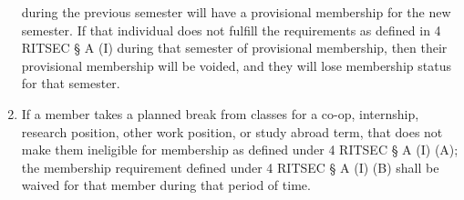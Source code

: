 \begin{enumerate}
	      during the previous semester will have a provisional membership for the new
	      semester. If that individual does not fulfill the requirements as defined in 4
	      RITSEC § A (I) during that semester of provisional membership, then their
	      provisional membership will be voided, and they will lose membership status for
	      that semester.
	\item If a member takes a planned break from classes for a co-op, internship,
	      research position, other work position, or study abroad term, that does not
	      make them ineligible for membership as defined under 4 RITSEC § A (I) (A); the
	      membership requirement defined under 4 RITSEC § A (I) (B) shall be waived for
	      that member during that period of time.
\end{enumerate}